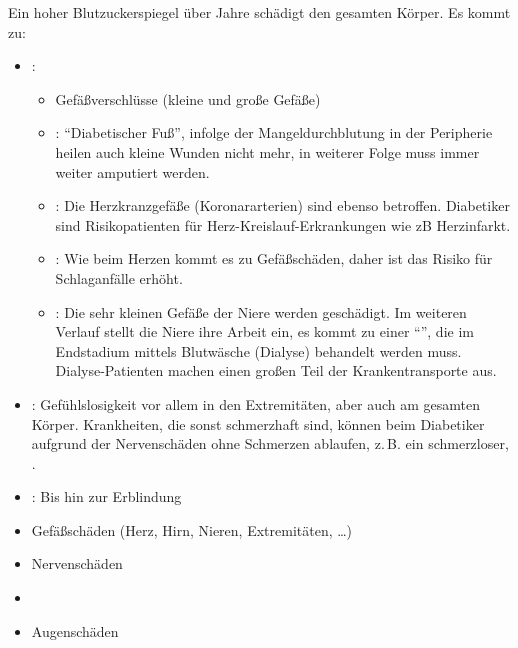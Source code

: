 {%
Ein hoher Blutzuckerspiegel über Jahre schädigt den gesamten
Körper. Es kommt zu:
\begin{itemize}
  \item {}: 
  \begin{itemize}
    \item Gefäßverschlüsse (kleine und große Gefäße)
    \item {}: \enquote{Diabetischer Fuß}, infolge der
    Mangeldurchblutung in der Peripherie heilen auch kleine
    Wunden nicht mehr, in weiterer Folge muss immer weiter
    amputiert werden.
    \item {}: Die Herzkranzgefäße (Koronar\-arterien)
    sind ebenso betroffen. Diabetiker sind Risikopatienten
    für Herz-Kreislauf-Erkrankungen wie zB Herz\-infarkt.
    \item {}: Wie beim Herzen kommt es zu
    Gefäßschäden, daher ist das Risiko für
    Schlaganfälle erhöht.
    \item {}: Die sehr kleinen Gefäße der
    Niere werden geschädigt. Im weiteren Verlauf stellt die Niere ihre
    Arbeit ein, es kommt zu einer \enquote{}, die im Endstadium mittels
    Blutwäsche (Dialyse) behandelt werden muss. Dialyse-Patienten machen
    einen großen Teil der Krankentransporte aus.
  \end{itemize}
  \item  {} :
  Gefühlslosigkeit vor allem in den Extremitäten, aber auch am
  gesamten Körper. Krankheiten, die sonst schmerzhaft sind,
  können beim Diabetiker aufgrund der Nervenschäden ohne
  Schmerzen ablaufen, z.\,B. ein schmerzloser, .
  \item  {}: Bis hin zur Erblindung
  
\end{itemize}

}{
\begin{itemize}
  \item Gefäßschäden (Herz, Hirn, Nieren, Extremitäten, \ldots)
  \item Nervenschäden
  \item {}
  \item Augenschäden
\end{itemize}
}{}{}{}








